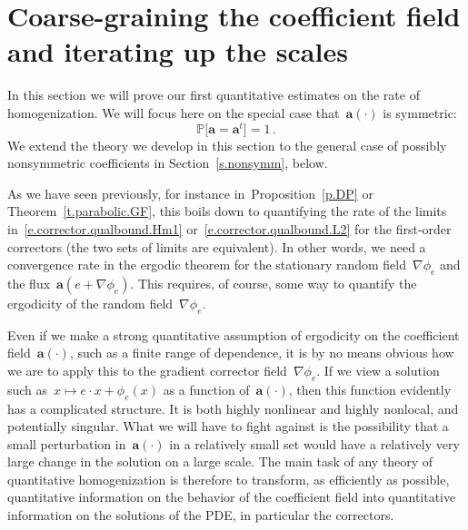 \documentclass[11pt]{article} %
\numberwithin{equation}{section}
\theoremstyle{definition}
\renewcommand{\a}{\mathbf{a}}
\renewcommand{\P}{\mathbb{P}}
\begin{document}
\section{Coarse-graining the coefficient field and iterating up the scales}
\label{s.subadd}


In this section we will prove our first quantitative estimates on the rate of homogenization. We will focus here on the special case that~$\a(\cdot)$ is symmetric:
\begin{equation}
\label{e.symm}
\P \bigl[  \a = \a^t \bigr] = 1 \,.
\end{equation}
We extend the theory we develop in this section to the general case of possibly nonsymmetric coefficients in Section~\ref{s.nonsymm}, below. 

\smallskip

As we have seen previously, for instance in~Proposition~\ref{p.DP} or Theorem~\ref{t.parabolic.GF}, this boils down to quantifying the rate of the limits in~\eqref{e.corrector.qualbound.Hm1} or~\eqref{e.corrector.qualbound.L2} for the first-order correctors (the two sets of limits are equivalent). 
In other words, we need a convergence rate in the ergodic theorem for the stationary random field~$\nabla \phi_e$ and the flux~$\a(e+\nabla \phi_e)$. This requires, of course, some way to quantify the ergodicity of the random field~$\nabla \phi_e$. 

\smallskip

Even if we make a strong quantitative assumption of ergodicity on the coefficient field~$\a(\cdot)$, such as a finite range of dependence, it is by no means obvious how we are to apply this to the gradient corrector field~$\nabla \phi_e$.
If we view a solution such as~$x\mapsto e\cdot x + \phi_e(x)$ as a function of~$\a(\cdot)$, then this function evidently has a complicated structure. It is both highly nonlinear and highly nonlocal, and potentially singular. What we will have to fight against is the possibility that a small perturbation in~$\a(\cdot)$ in a relatively small set would have a relatively very large change in the solution on a large scale.
The main task of any theory of quantitative homogenization is therefore to transform, as efficiently as possible, quantitative information on the behavior of the coefficient field into quantitative information on the solutions of the PDE, in particular the correctors.

\smallskip
\end{document}
